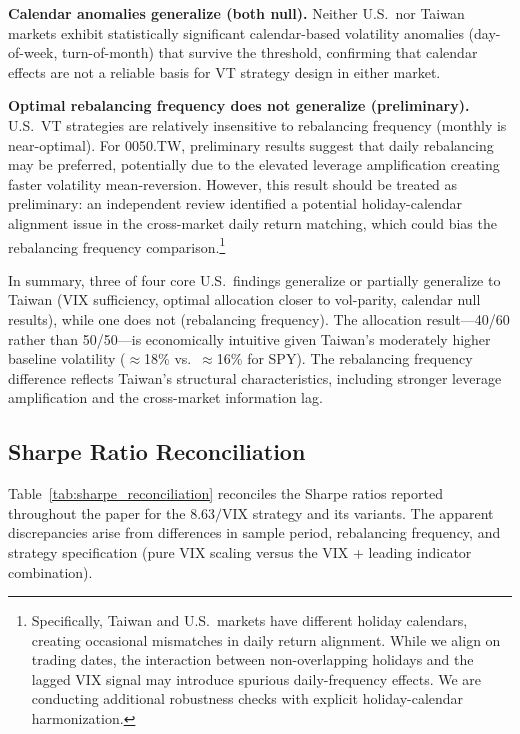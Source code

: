 \textbf{Calendar anomalies generalize (both null).} Neither U.S.\ nor Taiwan markets exhibit statistically significant calendar-based volatility anomalies (day-of-week, turn-of-month) that survive the \citet{harvey2016} threshold, confirming that calendar effects are not a reliable basis for VT strategy design in either market.

\textbf{Optimal rebalancing frequency does not generalize (preliminary).} U.S.\ VT strategies are relatively insensitive to rebalancing frequency (monthly is near-optimal). For 0050.TW, preliminary results suggest that daily rebalancing may be preferred, potentially due to the elevated leverage amplification creating faster volatility mean-reversion. However, this result should be treated as preliminary: an independent review identified a potential holiday-calendar alignment issue in the cross-market daily return matching, which could bias the rebalancing frequency comparison.\footnote{Specifically, Taiwan and U.S.\ markets have different holiday calendars, creating occasional mismatches in daily return alignment. While we align on trading dates, the interaction between non-overlapping holidays and the lagged VIX signal may introduce spurious daily-frequency effects. We are conducting additional robustness checks with explicit holiday-calendar harmonization.}

In summary, three of four core U.S.\ findings generalize or partially generalize to Taiwan (VIX sufficiency, optimal allocation closer to vol-parity, calendar null results), while one does not (rebalancing frequency). The allocation result---40/60 rather than 50/50---is economically intuitive given Taiwan's moderately higher baseline volatility ($\approx$18\% vs.\ $\approx$16\% for SPY). The rebalancing frequency difference reflects Taiwan's structural characteristics, including stronger leverage amplification and the cross-market information lag.

\subsection{Sharpe Ratio Reconciliation}

Table~\ref{tab:sharpe_reconciliation} reconciles the Sharpe ratios reported throughout the paper for the $8.63/\text{VIX}$ strategy and its variants. The apparent discrepancies arise from differences in sample period, rebalancing frequency, and strategy specification (pure VIX scaling versus the VIX + leading indicator combination).

